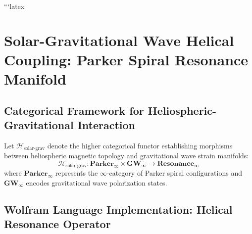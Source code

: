 ﻿```latex
\section{Solar-Gravitational Wave Helical Coupling: Parker Spiral Resonance Manifold}


\subsection{Categorical Framework for Heliospheric-Gravitational Interaction}


\begin{definition}
Let $\mathscr{H}_{\text{solar-grav}}$ denote the higher categorical functor establishing morphisms between heliospheric magnetic topology and gravitational wave strain manifolds:
\begin{equation}
\mathscr{H}_{\text{solar-grav}}: \mathbf{Parker}_\infty \times \mathbf{GW}_\infty \to \mathbf{Resonance}_\infty
\end{equation}
where $\mathbf{Parker}_\infty$ represents the $\infty$-category of Parker spiral configurations and $\mathbf{GW}_\infty$ encodes gravitational wave polarization states.
\end{definition}


\subsection{Wolfram Language Implementation: Helical Resonance Operator}


